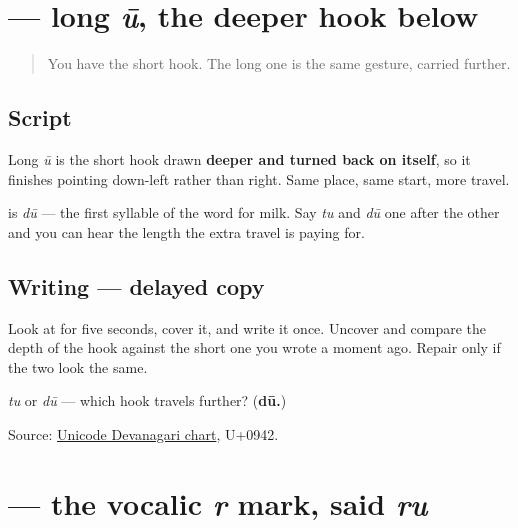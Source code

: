 \section[\texorpdfstring{\mr{ू} (ū)}{ू (ū)}]{ — long \emph{ū}, the deeper hook below}

\label{lesson:MR-W05-uu-matra}



\begin{quote}
You have the short hook. The long one is the same gesture, carried further.
\end{quote}

\subsection*{Script}
\begin{quote}
\end{quote}

Long \emph{ū} is the short hook drawn \textbf{deeper and turned back on itself}, so it finishes pointing down-left rather than right. Same place, same start, more travel.

\textbf{} is \emph{dū} — the first syllable of the word for milk. Say \emph{tu} and \emph{dū} one after the other and you can hear the length the extra travel is paying for.

\subsection*{Writing — delayed copy}

Look at \textbf{} for five seconds, cover it, and write it once. Uncover and compare the depth of the hook against the short one you wrote a moment ago. Repair only if the two look the same.

\begin{tcolorbox}[breakable,colback=teal!4,colframe=teal!35!black,title={Before you move on}]
\emph{tu} or \emph{dū} — which hook travels further? (\textbf{dū.})

Source: \href{https://www.unicode.org/charts/PDF/U0900.pdf}{Unicode Devanagari chart}, U+0942.
\end{tcolorbox}
\section[\texorpdfstring{\mr{ृ} (ṛ)}{ृ (ṛ)}]{ — the vocalic \emph{r} mark, said \emph{ru}}


